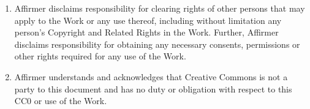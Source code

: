 {\begin{enumerate}[noitemsep,label=\alph*.]
    \item Affirmer disclaims responsibility for clearing rights of
    other persons that may apply to the Work or any use thereof,
    including without limitation any person's Copyright and
    Related Rights in the Work. Further, Affirmer disclaims
    responsibility for obtaining any necessary consents,
    permissions or other rights required for any use of the
    Work.
    
    \item Affirmer understands and acknowledges that Creative
    Commons is not a party to this document and has no duty or
    obligation with respect to this CC0 or use of the Work.

  \end{enumerate}

}

